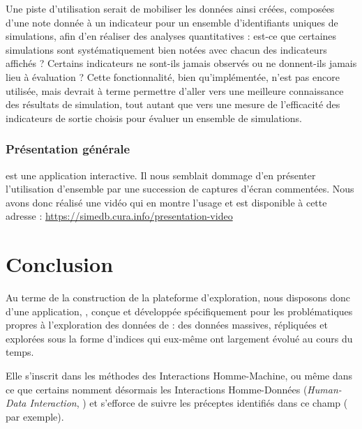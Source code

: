 Une piste d'utilisation serait de mobiliser les données ainsi créées, composées d'une note donnée à un indicateur pour un ensemble d'identifiants uniques de simulations, afin d'en réaliser des analyses quantitatives : est-ce que certaines simulations sont systématiquement bien notées avec chacun des indicateurs affichés ? Certains indicateurs ne sont-ils jamais observés ou ne donnent-ils jamais lieu à évaluation ?
Cette fonctionnalité, bien qu'implémentée, n'est pas encore utilisée, mais devrait à terme permettre d'aller vers une meilleure connaissance des résultats de simulation, tout autant que vers une mesure de l'efficacité des indicateurs de sortie choisis pour évaluer un ensemble de simulations.

\subsubsection{Présentation générale}

\simedb{} est une application interactive.
Il nous semblait dommage d'en présenter l'utilisation d'ensemble par une succession de captures d'écran commentées.
Nous avons donc réalisé une vidéo qui en montre l'usage et est disponible à cette adresse : \href{https://simedb.cura.info/presentation-video}{https://simedb.cura.info/presentation-video}


\section*{Conclusion}

Au terme de la construction de la plateforme d'exploration, nous disposons donc d'une application, \simedb{}, conçue et développée spécifiquement pour les problématiques propres à l'exploration des données de \simfeodal{} : des données massives, répliquées et explorées sous la forme d'indices qui eux-même ont largement évolué au cours du temps.

Elle s'inscrit dans les méthodes des Interactions Homme-Machine, ou même dans ce que certains nomment désormais les \og Interactions Homme-Données\fg{} (\og \textit{Human-Data Interaction}\fg{}, \cite{elmqvist_embodied_2011,mortier_human-data_2014}) et s'efforce de suivre les préceptes identifiés dans ce champ (\cite[167-170]{amirpour_amraii_human-data_2018} par exemple).

